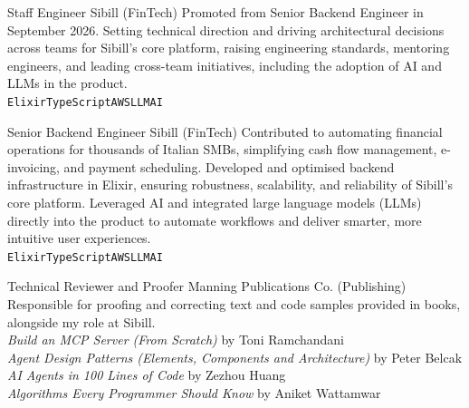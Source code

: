 \documentclass[9pt]{developercv}
\begin{document}

\begin{entrylist}
        {Staff Engineer}
        {Sibill \textnormal{(FinTech)}}
        {Promoted from Senior Backend Engineer in September 2026. Setting technical direction and driving architectural decisions across teams for Sibill's core platform, raising engineering standards, mentoring engineers, and leading cross-team initiatives, including the adoption of AI and LLMs in the product.\\
       \texttt{Elixir}\slashsep\texttt{TypeScript}\slashsep\texttt{AWS}\slashsep\texttt{LLM}\slashsep\texttt{AI}}

        {Senior Backend Engineer}
        {Sibill \textnormal{(FinTech)}}
        {Contributed to automating financial operations for thousands of Italian SMBs, simplifying cash flow management, e-invoicing, and payment scheduling. Developed and optimised backend infrastructure in Elixir, ensuring robustness, scalability, and reliability of Sibill's core platform. Leveraged AI and integrated large language models (LLMs) directly into the product to automate workflows and deliver smarter, more intuitive user experiences.\\
       \texttt{Elixir}\slashsep\texttt{TypeScript}\slashsep\texttt{AWS}\slashsep\texttt{LLM}\slashsep\texttt{AI}}

        {Technical Reviewer and Proofer}
        {Manning Publications Co. \textnormal{(Publishing)}}
        {Responsible for proofing and correcting text and code samples provided in books, alongside my role at Sibill.\\
       \textit{Build an MCP Server (From Scratch)} by Toni Ramchandani\\
       \textit{Agent Design Patterns (Elements, Components and Architecture)} by Peter Belcak\\
       \textit{AI Agents in 100 Lines of Code} by Zezhou Huang\\
       \textit{Algorithms Every Programmer Should Know} by Aniket Wattamwar}


\end{entrylist}
\end{document}
